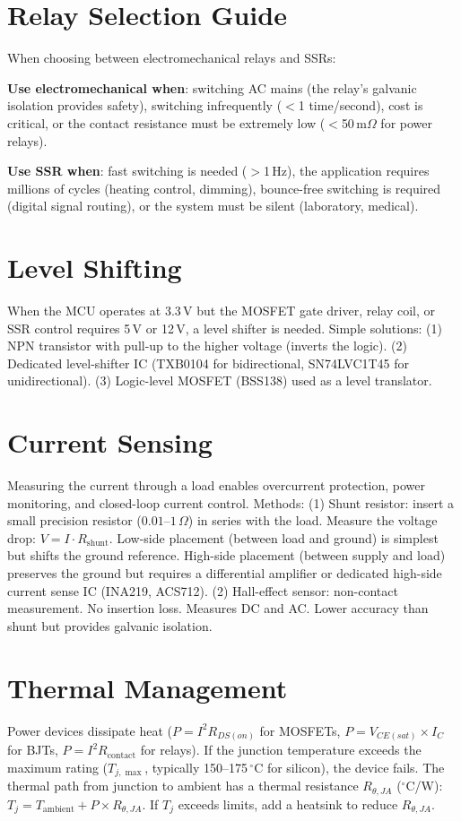 \documentclass[11pt,letterpaper,twoside,openany]{book}
\newcommand{\degC}{\ensuremath{{}^{\circ}\text{C}}}
\begin{document}
\section{Relay Selection Guide}
When choosing between electromechanical relays and SSRs:

\textbf{Use electromechanical when}: switching AC mains (the relay's galvanic isolation provides safety), switching infrequently ($<$1 time/second), cost is critical, or the contact resistance must be extremely low ($<$50\,m$\Omega$ for power relays).

\textbf{Use SSR when}: fast switching is needed ($>$1\,Hz), the application requires millions of cycles (heating control, dimming), bounce-free switching is required (digital signal routing), or the system must be silent (laboratory, medical).

\section{Level Shifting}
When the MCU operates at 3.3\,V but the MOSFET gate driver, relay coil, or SSR control requires 5\,V or 12\,V, a level shifter is needed. Simple solutions: (1) NPN transistor with pull-up to the higher voltage (inverts the logic). (2) Dedicated level-shifter IC (TXB0104 for bidirectional, SN74LVC1T45 for unidirectional). (3) Logic-level MOSFET (BSS138) used as a level translator.

\section{Current Sensing}
Measuring the current through a load enables overcurrent protection, power monitoring, and closed-loop current control. Methods: (1) Shunt resistor: insert a small precision resistor ($0.01$--$1\,\Omega$) in series with the load. Measure the voltage drop: $V = I \cdot R_{\text{shunt}}$. Low-side placement (between load and ground) is simplest but shifts the ground reference. High-side placement (between supply and load) preserves the ground but requires a differential amplifier or dedicated high-side current sense IC (INA219, ACS712). (2) Hall-effect sensor: non-contact measurement. No insertion loss. Measures DC and AC. Lower accuracy than shunt but provides galvanic isolation.

\section{Thermal Management}
Power devices dissipate heat ($P = I^2 R_{DS(on)}$ for MOSFETs, $P = V_{CE(sat)} \times I_C$ for BJTs, $P = I^2 R_{\text{contact}}$ for relays). If the junction temperature exceeds the maximum rating ($T_{j,\max}$, typically 150--175\,\degC{} for silicon), the device fails. The thermal path from junction to ambient has a thermal resistance $R_{\theta,JA}$ (\degC{}/W): $T_j = T_{\text{ambient}} + P \times R_{\theta,JA}$. If $T_j$ exceeds limits, add a heatsink to reduce $R_{\theta,JA}$.
\end{document}
